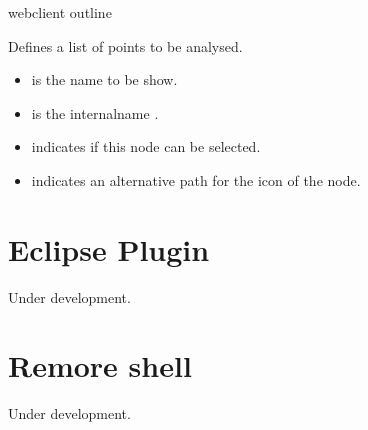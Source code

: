 \bigskip
\xmlstruct
{webclient}
{outline}
{
%
  Defines a list of points to be analysed.
\begin{itemize}
  \item {} is the name to be show.
   \item {} is the internalname .
\item {} indicates if this node can be
  selected.
\item {} indicates an alternative path for the icon
  of the node.

\end{itemize}
%
}





\section{Eclipse Plugin}
\label{ch:clients:eclipse}

Under development. 

\section{Remore shell}
\label{ch:clients:shell}

Under development. 

